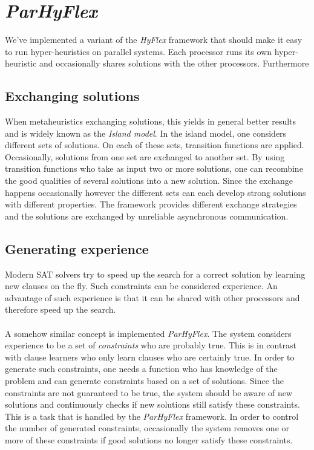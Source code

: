\documentclass[a4paper,10pt]{article}
\newcommand{\seclab}[1]{\label{sec:#1}}
\begin{document}
\section{\emph{ParHyFlex}}
\seclab{parhyflex}
We've implemented a variant of the \emph{HyFlex} framework that should make it easy to run hyper-heuristics on parallel systems. Each processor runs its own hyper-heuristic and occasionally shares solutions with the other processors. Furthermore 

\subsection{Exchanging solutions}
\seclab{exchangingsolutions}
When metaheuristics exchanging solutions, this yields in general better results and is widely known as the \emph{Island model}\cite{islandmodel}. In the island model, one considers different sets of solutions. On each of these sets, transition functions are applied. Occasionally, solutions from one set are exchanged to another set. By using transition functions who take as input two or more solutions, one can recombine the good qualities of several solutions into a new solution. Since the exchange happens occasionally however the different sets can each develop strong solutions with different properties. The framework provides different exchange strategies and the solutions are exchanged by unreliable asynchronous communication.

\subsection{Generating experience}
\seclab{generatingexperience}
Modern SAT solvers try to speed up the search for a correct solution by learning new clauses on the fly. Such constraints can be considered experience. An advantage of such experience is that it can be shared with other processors and therefore speed up the search.

\paragraph{}
A somehow similar concept is implemented \emph{ParHyFlex}. The system considers experience to be a set of \emph{constraints} who are probably true. This is in contrast with clause learners who only learn clauses who are certainly true. In order to generate such constraints, one needs a function who has knowledge of the problem and can generate constraints based on a set of solutions. Since the constraints are not guaranteed to be true, the system should be aware of new solutions and continuously checks if new solutions still satisfy these constraints. This is a task that is handled by the \emph{ParHyFlex} framework. In order to control the number of generated constraints, occasionally the system removes one or more of these constraints if good solutions no longer satisfy these constraints. %
\end{document}
